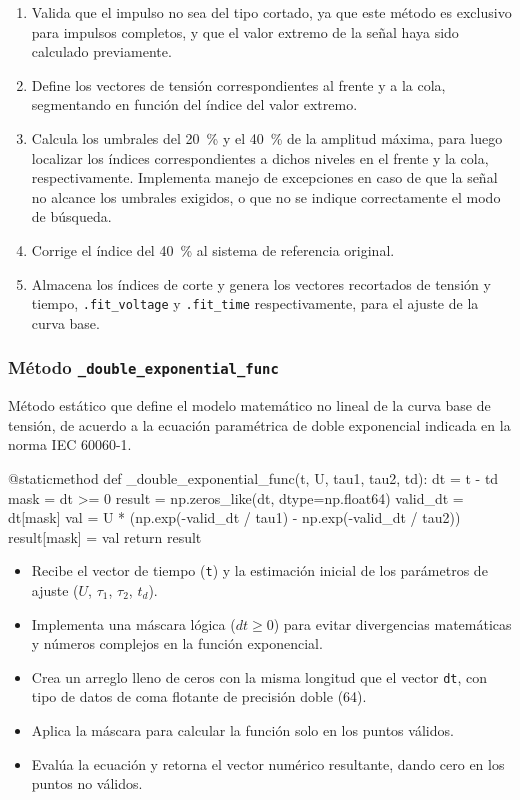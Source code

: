 \begin{enumerate}
    \item Valida que el impulso no sea del tipo cortado, ya que este método es exclusivo para impulsos completos, y que el valor extremo de la señal haya sido calculado previamente.
    \item Define los vectores de tensión correspondientes al frente y a la cola, segmentando en función del índice del valor extremo.
    \item Calcula los umbrales del \SI{20}{\percent} y el \SI{40}{\percent} de la amplitud máxima, para luego localizar los índices correspondientes a dichos niveles en el frente y la cola, respectivamente. Implementa manejo de excepciones en caso de que la señal no alcance los umbrales exigidos, o que no se indique correctamente el modo de búsqueda.
    \item Corrige el índice del \SI{40}{\percent} al sistema de referencia original.
    \item Almacena los índices de corte y genera los vectores recortados de tensión y tiempo, \texttt{.fit\_voltage} y \texttt{.fit\_time} respectivamente, para el ajuste de la curva base.
\end{enumerate}

\subsubsection{Método \texttt{\_double\_exponential\_func}}
Método estático que define el modelo matemático no lineal de la curva base de tensión, de acuerdo a la ecuación paramétrica de doble exponencial indicada en la norma IEC 60060-1.

\begin{python}
@staticmethod
def _double_exponential_func(t, U, tau1, tau2, td):
    dt = t - td
    mask = dt >= 0
    result = np.zeros_like(dt, dtype=np.float64)
    valid_dt = dt[mask]
    val = U * (np.exp(-valid_dt / tau1) - np.exp(-valid_dt / tau2))
    result[mask] = val
    return result
\end{python}

\begin{itemize}
\item Recibe el vector de tiempo (\texttt{t}) y la estimación inicial de los parámetros de ajuste ($U$, $\tau_1$, $\tau_2$, $t_d$).
\item Implementa una máscara lógica ($dt \ge 0$) para evitar divergencias matemáticas y números complejos en la función exponencial.
\item Crea un arreglo lleno de ceros con la misma longitud que el vector \texttt{dt}, con tipo de datos de coma flotante de precisión doble (\SI{64}{\bit}).
\item Aplica la máscara para calcular la función solo en los puntos válidos.
\item Evalúa la ecuación y retorna el vector numérico resultante, dando cero en los puntos no válidos.
\end{itemize}

